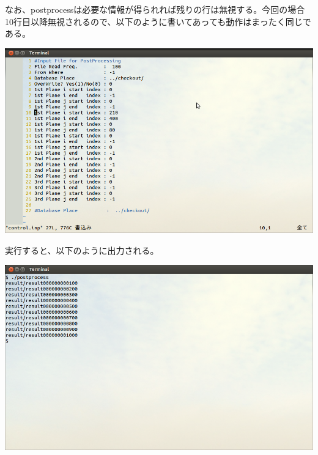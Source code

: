 \documentclass{jsarticle}
\begin{document}
なお、postprocessは必要な情報が得られれば残りの行は無視する。今回の場合10行目以降無視されるので、以下のように書いてあっても動作はまったく同じである。
\begin{center}
\includegraphics[width=.8\textwidth,bb=0 0 962 577]{tutorial_img/240.png}
\end{center}
実行すると、以下のように出力される。
\begin{center}
\includegraphics[width=.8\textwidth,bb=0 0 962 577]{tutorial_img/250.png}
\end{center}
\end{document}
